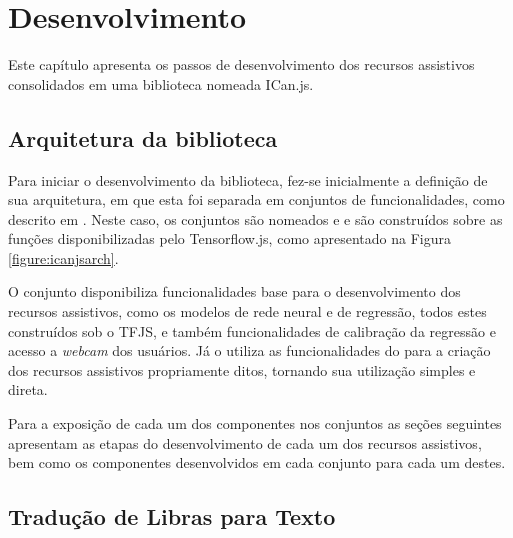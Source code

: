 \newpage
\chapter{Desenvolvimento}
\label{ch:desenvolvimento}

\par Este capítulo apresenta os passos de desenvolvimento dos recursos assistivos consolidados em uma biblioteca nomeada ICan.js.

\section{Arquitetura da biblioteca}


\par Para iniciar o desenvolvimento da biblioteca, fez-se inicialmente a definição de sua arquitetura, em que esta foi separada em conjuntos de funcionalidades, como descrito em \cite{tensorflowjs2019}. Neste caso, os conjuntos são nomeados  e  e são construídos sobre as funções disponibilizadas pelo Tensorflow.js, como apresentado na Figura \ref{figure:icanjsarch}.


\par O conjunto  disponibiliza funcionalidades base para o desenvolvimento dos recursos assistivos, como os modelos de rede neural e de regressão, todos estes construídos sob o TFJS, e também funcionalidades de calibração da regressão e acesso a \textit{webcam} dos usuários. Já o  utiliza as funcionalidades do  para a criação dos recursos assistivos propriamente ditos, tornando sua utilização simples e direta.

\par Para a exposição de cada um dos componentes nos conjuntos as seções seguintes apresentam as etapas do desenvolvimento de cada um dos recursos assistivos, bem como os componentes desenvolvidos em cada conjunto para cada um destes.

\section{Tradução de Libras para Texto}

